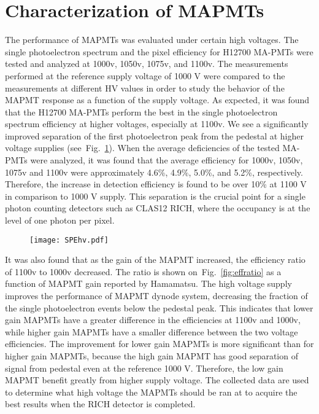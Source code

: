 \section{Characterization of MAPMTs}
The performance of MAPMTs was evaluated under certain high voltages.
The single photoelectron spectrum and the pixel efficiency for H12700 MA-PMTs were tested and analyzed at 1000v, 1050v, 1075v, and 1100v.
The measurements performed at the reference supply voltage of 1000 V were compared to the measurements at different HV values in order to study the behavior of the MAPMT response as a function of the supply voltage.
As expected, it was found that the H12700 MA-PMTs perform the best in the single photoelectron spectrum efficiency at higher voltages, especially at 1100v.
We see a significantly improved separation of the first photoelectron peak from the pedestal at higher voltage supplies (see~Fig.~\ref{fig:SPEhv}).
When the average deficiencies of the tested MA-PMTs were analyzed, it was found that the average efficiency for 1000v, 1050v, 1075v and 1100v were approximately 4.6\%, 4.9\%, 5.0\%, and 5.2\%, respectively.
Therefore, the increase in detection efficiency is found to be over 10\% at 1100 V in comparison to 1000 V supply.
This separation is the crucial point for a single photon counting detectors such as CLAS12 RICH, where the occupancy is at the level of one photon per pixel.

\begin{figure}[b]
	\centering
	\centering
	\texttt{[image: SPEhv.pdf]}
	\label{fig:SPEhv}
\end{figure}



It was also found that as the gain of the MAPMT increased, the efficiency ratio of 1100v to 1000v decreased.
The ratio is shown on~Fig.~\ref{fig:effratio} as a function of MAPMT gain reported by Hamamatsu.
The high voltage supply improves the performance of MAPMT dynode system, decreasing the fraction of the single photoelectron events below the pedestal peak.
This indicates that lower gain MAPMTs have a greater difference in the efficiencies at 1100v and 1000v, while higher gain MAPMTs have a smaller difference between the two voltage efficiencies.
The improvement for lower gain MAPMTs is more significant than for higher gain MAPMTs, because the high gain MAPMT has good separation of signal from pedestal even at the reference 1000 V.
Therefore, the low gain MAPMT benefit greatly from higher supply voltage.
The collected data are used to determine what high voltage the MAPMTs should be ran at to acquire the best results when the RICH detector is completed.


